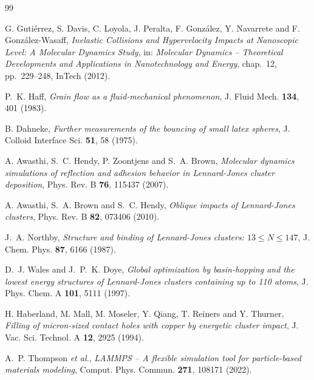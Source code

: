 \documentclass[aps,pre,twocolumn,reprint,superscriptaddress]{revtex4-2}
\begin{document}
\begin{thebibliography}{99}

G. Gutiérrez, S. Davis, C. Loyola, J. Peralta, F. González, Y. Navarrete
and F. González-Wasaff,
\textit{Inelastic Collisions and Hypervelocity Impacts at Nanoscopic Level:
A Molecular Dynamics Study},
in: \textit{Molecular Dynamics -- Theoretical Developments and Applications
in Nanotechnology and Energy}, chap.~12, pp.~229--248, InTech (2012).

P.~K. Haff,
\textit{Grain flow as a fluid-mechanical phenomenon},
J. Fluid Mech. \textbf{134}, 401 (1983).

B. Dahneke,
\textit{Further measurements of the bouncing of small latex spheres},
J. Colloid Interface Sci. \textbf{51}, 58 (1975).

A. Awasthi, S.~C. Hendy, P. Zoontjens and S.~A. Brown,
\textit{Molecular dynamics simulations of reflection and adhesion behavior
in Lennard-Jones cluster deposition},
Phys. Rev. B \textbf{76}, 115437 (2007).

A. Awasthi, S.~A. Brown and S.~C. Hendy,
\textit{Oblique impacts of Lennard-Jones clusters},
Phys. Rev. B \textbf{82}, 073406 (2010).

J.~A. Northby,
\textit{Structure and binding of Lennard-Jones clusters: $13 \le N \le 147$},
J. Chem. Phys. \textbf{87}, 6166 (1987).

D.~J. Wales and J.~P.~K. Doye,
\textit{Global optimization by basin-hopping and the lowest energy
structures of Lennard-Jones clusters containing up to 110 atoms},
J. Phys. Chem. A \textbf{101}, 5111 (1997).

H. Haberland, M. Mall, M. Moseler, Y. Qiang, T. Reiners and Y. Thurner,
\textit{Filling of micron-sized contact holes with copper by energetic
cluster impact},
J. Vac. Sci. Technol. A \textbf{12}, 2925 (1994).

A.~P. Thompson \textit{et al.},
\textit{LAMMPS -- A flexible simulation tool for particle-based materials
modeling},
Comput. Phys. Commun. \textbf{271}, 108171 (2022).

\end{thebibliography}
\end{document}
